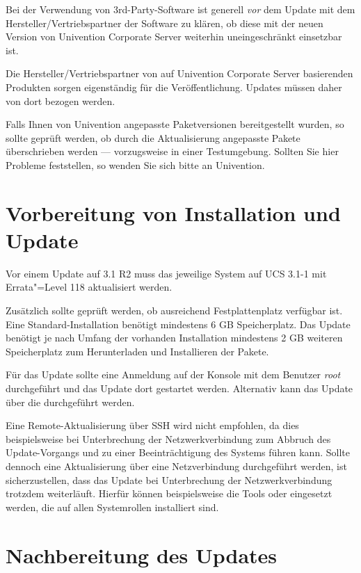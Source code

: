 Bei der Verwendung von 3rd-Party-Software ist generell \emph{vor} dem Update
mit dem Hersteller/Vertriebspartner der Software zu klären, ob
diese mit der neuen Version von Univention Corporate Server weiterhin
uneingeschränkt einsetzbar ist. 

Die Hersteller/Vertriebspartner von auf Univention Corporate Server
basierenden Produkten sorgen eigenständig für die Veröffentlichung. Updates
müssen daher von dort bezogen werden.

Falls Ihnen von Univention angepasste Paketversionen bereitgestellt wurden, so
sollte geprüft werden, ob durch die Aktualisierung angepasste Pakete
überschrieben werden --- vorzugsweise in einer Testumgebung. Sollten Sie hier
Probleme feststellen, so wenden Sie sich bitte an Univention.

\chapter{Vorbereitung von Installation und Update}
Vor einem Update auf \ucsUAS{} 3.1 R2 muss das jeweilige System auf UCS 3.1-1 mit Errata"=Level 118 aktualisiert werden.

Zusätzlich sollte geprüft werden, ob ausreichend Festplattenplatz verfügbar ist. Eine
Standard-Installation benötigt mindestens 6 GB Speicherplatz. Das
Update benötigt je nach Umfang der vorhanden Installation mindestens 2 GB
weiteren Speicherplatz zum Herunterladen und Installieren der Pakete.

Für das Update sollte eine Anmeldung auf der Konsole mit dem
Benutzer \emph{root} durchgeführt und das Update dort gestartet werden.
Alternativ kann das Update über die \ucsUMC{} durchgeführt werden.

Eine Remote-Aktualisierung über SSH wird nicht empfohlen, da dies
beispielsweise bei Unterbrechung der Netzwerkverbindung zum Abbruch des
Update-Vorgangs und zu einer Beeinträchtigung des Systems führen kann. Sollte
dennoch eine Aktualisierung über eine Netzverbindung durchgeführt werden, ist
sicherzustellen, dass das Update bei Unterbrechung der Netzwerkverbindung trotzdem
weiterläuft. Hierfür können beispielsweise die Tools  oder
 eingesetzt werden, die auf allen Systemrollen installiert sind.


\chapter{Nachbereitung des Updates}

